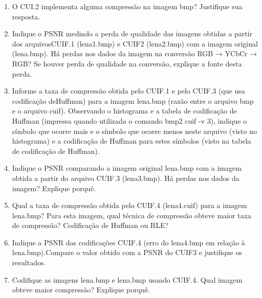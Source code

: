 \documentclass[12pt, a4paper, oneside]{abntex2}
\begin{document}
    \printcoverufsc

    \begin{enumerate}
        \item O CUI.2 implementa alguma compressão na imagem bmp?
                Justifique sua resposta.

        \item Indique o PSNR medindo a perda de qualidade das imagens obtidas a partir dos arquivosCUIF.1 (lena1.bmp) e CUIF2 (lena2.bmp) com a imagem original (lena.bmp).
            Há perdas nos dados da imagem na conversão RGB → YCbCr → RGB? Se houver perda de qualidade na conversão, explique a fonte desta perda.

        \item Informe a taxa de compressão obtida pelo CUIF.1 e pelo CUIF.3 (que usa codificação deHuffman) para a imagem lena.bmp (razão entre o arquivo bmp e o arquivo cuif).
            Observando o histograma e a tabela de codificação de Huffman (impressa quando utilizada o comando bmp2 cuif -v 3), indique o símbolo que ocorre mais e o símbolo que ocorre menos neste arquivo (visto no histograma) e a codificação de Huffman para estes símbolos (visto na tabela de codificação de Huffman).

        \item Indique o PSNR comparando a imagem original lena.bmp com a imagem obtida a partir do arquivo CUIF.3 (lena3.bmp).
            Há perdas nos dados da imagem?
            Explique porquê.

        \item Qual a taxa de compressão obtida pelo CUIF.4 (lena4.cuif) para a imagem lena.bmp?
                Para esta imagem, qual técnica de compressão obteve maior taxa de compressão?
                Codificação de Huffman ou RLE?

        \item Indique a PSNR das codificações CUIF.4 (erro do lena4.bmp em relação à lena.bmp).Compare o valor obtido com a PSNR do CUIF3 e justifique os resultados.

        \item Codifique as imagens lena.bmp e lena.bmp usando CUIF.4. Qual imagem obteve maior compressão?
                Explique porquê.


    \end{enumerate}
\end{document}
